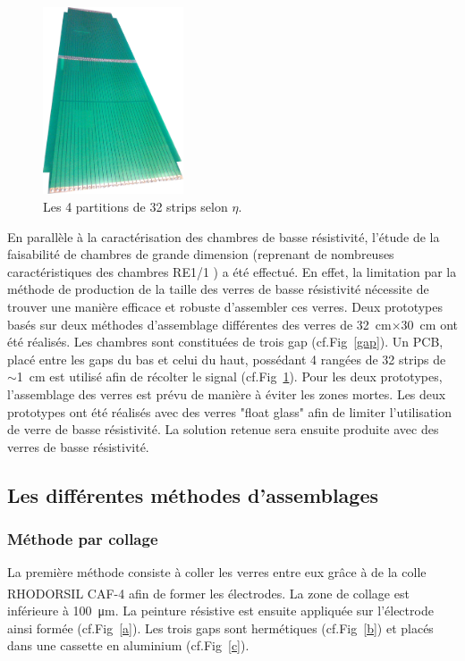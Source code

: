 \begin{figure}
	\vspace*{-1cm}
	\centering
	\includegraphics[width=0.37\textwidth]{GLA/strips.jpg}
	\caption{Les \num{4} partitions de \num{32} strips selon $\eta$.}
	\label{strips}
\end{figure}

En parallèle à la caractérisation des chambres de basse résistivité, l'étude de la faisabilité de chambres de grande dimension (reprenant de nombreuses caractéristiques des chambres RE1/1 \cite{gapss}) a été effectué. En effet, la limitation par la méthode de production de la taille des verres de basse résistivité nécessite de trouver une manière efficace et robuste d'assembler ces verres.  Deux prototypes basés sur deux méthodes d'assemblage différentes des verres de \SI{32}{\centi\meter}$\times$\SI{30}{\centi\meter} ont été réalisés. Les chambres sont constituées de trois gap (cf.Fig~\ref{gap}). Un PCB, placé entre les gaps du bas et celui du haut, possédant \num{4} rangées de \num{32} strips de $\sim$\SI{1}{\centi\meter} est utilisé afin de récolter le signal (cf.Fig~\ref{strips}). Pour les deux prototypes, l'assemblage des verres est prévu de manière à éviter les zones mortes. Les deux prototypes ont été réalisés avec des verres "float glass" afin de limiter l'utilisation de verre de basse résistivité. La solution retenue sera ensuite produite avec des verres de basse résistivité.

\subsection{Les différentes méthodes d'assemblages} 
\subsubsection{Méthode par collage}
La première méthode consiste à coller les verres entre eux grâce à de la colle RHODORSIL\textsuperscript{\textregistered}
 CAF-4 afin de former les électrodes. La zone de collage est inférieure à \SI{100}{\micro\meter}. La peinture résistive est ensuite appliquée sur l'électrode ainsi formée (cf.Fig~\ref{a}). Les trois gaps sont hermétiques (cf.Fig~\ref{b}) et placés dans une cassette en aluminium (cf.Fig~\ref{c}).
 
